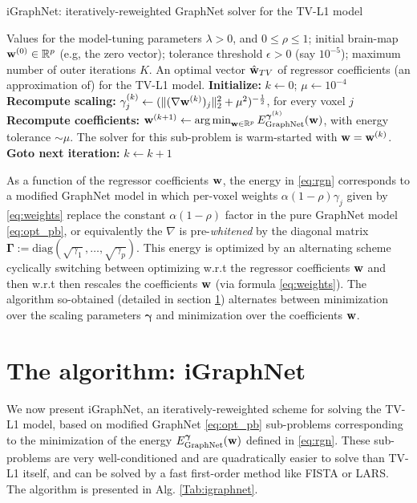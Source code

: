 \begin{algorithm}
\caption{iGraphNet: iteratively-reweighted GraphNet solver for the
  TV-L1 model}
\label{Tab:igraphnet}
\begin{algorithmic}[1]
\Require Values for the model-tuning parameters
  $\lambda > 0$, and $0 \le \rho \le 1$; initial brain-map $\mathbf{w}^{(0)}
  \in \mathbb R^p$ (e.g, the zero vector); tolerance threshold
  $\epsilon > 0$ (say $10^{-5}$); maximum number of outer iterations
  $K$.
\Ensure An optimal vector $\hat{\mathbf{w}}_{TV}$ of regressor coefficients (an approximation of)
for the TV-L1 model.
\State  \textbf{Initialize:} $k \leftarrow 0$; $\mu \leftarrow 10^{-4}$
\State \textbf{Recompute scaling:} $\gamma_j^{(k)} \leftarrow (\|(\nabla
\mathbf{w}^{(k)})_j\|_2^2 + {\mu}^2)^{-\frac{1}{2}}$, for every voxel $j$
\State  \textbf{Recompute coefficients:} $\mathbf{w}^{(k + 1)}
  \leftarrow \operatorname*{arg\,min}_{\mathbf{w} \in \mathbb R^p}
  E_{\text{GraphNet}}^{\boldsymbol{\gamma}^{(k)}}(\mathbf{w})$, with energy
  tolerance $\sim \mu$. The solver for this sub-problem
  is warm-started with $\mathbf{w} = \mathbf{w}^{(k)}$.
\State \textbf{Goto next iteration:} $k \leftarrow k + 1$
\EndWhile
\end{algorithmic}
\end{algorithm}

As a function of the regressor coefficients $\mathbf{w}$, the energy in
\eqref{eq:rgn} corresponds to a modified
GraphNet model in which per-voxel weights $\alpha(1 - \rho)\gamma_j$ given
by \eqref{eq:weights} replace the constant $\alpha(1 - \rho)$ factor
in the pure GraphNet model \eqref{eq:opt_pb}, or
equivalently the $\nabla$ is pre-\textit{whitened} by the diagonal
matrix $\boldsymbol{\Gamma} := \mathrm{diag}(\sqrt{\gamma_1},\ldots,\sqrt{\gamma_p})$. This energy
is optimized by an alternating scheme cyclically switching between
optimizing w.r.t the regressor coefficients $\mathbf{w}$ and then w.r.t
then rescales the coefficients $\mathbf{w}$ (via formula \eqref{eq:weights}). The algorithm
so-obtained (detailed in section \ref{sec:algo}) alternates between minimization over the scaling parameters $\boldsymbol{\gamma}$ and minimization over the coefficients $\mathbf{w}$.
\section{The algorithm: iGraphNet}
\label{sec:algo}
We now present iGraphNet, an iteratively-reweighted scheme for
solving the TV-L1 model, based on modified GraphNet \eqref{eq:opt_pb}
sub-problems corresponding to the minimization of the energy
$E_{\text{GraphNet}}^{\boldsymbol{\gamma}}(\mathbf{w})$ defined in
\eqref{eq:rgn}. These sub-problems  are very well-conditioned and are
quadratically easier to solve than TV-L1 itself, and can be solved by
a fast first-order method like FISTA or LARS. The algorithm is presented in
Alg. \ref{Tab:igraphnet}.

